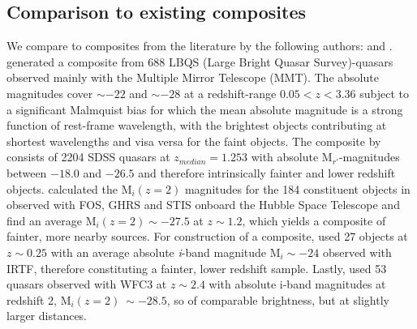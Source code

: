 \documentclass{aa}    %
\newcommand{\sectlabel}[1]{\label{sect:#1}}
\begin{document}
\subsection{Comparison to existing composites} \sectlabel{comparison}

We compare to composites from the literature by the following authors:
\citet{Francis1991, VandenBerk2001, Telfer2002, Glikman2006} and
\citet{Lusso2015}. \citet{Francis1991} generated a composite from 688
LBQS (Large Bright Quasar Survey)-quasars observed mainly with the Multiple Mirror Telescope (MMT). The absolute magnitudes cover $\sim -22$
and $\sim -28$ at a redshift-range $0.05 < z < 3.36$ subject to a
significant Malmquist bias for which the mean absolute magnitude is a
strong function of rest-frame wavelength, with the brightest objects
contributing at shortest wavelengths and visa versa for the faint
objects. The composite by \citet{VandenBerk2001} consists of 2204 SDSS
quasars at $z_{median} = 1.253$ with absolute M$_{r'}$-magnitudes
between $-18.0$ and $-26.5$ and therefore intrinsically fainter and
lower redshift objects. \citet{Lusso2015} calculated the M$_i(z=2)$
magnitudes for the 184 constituent objects in \citet{Telfer2002}
observed with FOS, GHRS and STIS onboard the Hubble Space Telescope and find an average
M$_i(z=2) \sim -27.5$ at $z \sim 1.2$, which yields a composite of
fainter, more nearby sources. For construction of a composite,
\citet{Glikman2006} used 27 objects at $z \sim 0.25$ with an average
absolute \textit{i}-band magnitude M$_i \sim -24$ observed with IRTF,
therefore constituting a fainter, lower redshift sample. Lastly,
\citet{Lusso2015} used 53 quasars observed with WFC3 at $z \sim 2.4$
with absolute i-band magnitudes at redshift 2, M$_i(z=2) ~\sim -28.5$,
so of comparable brightness, but at slightly larger distances.
\end{document}
